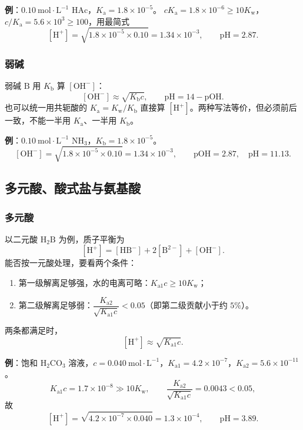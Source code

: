 \documentclass[UTF8]{ctexbook}
\begin{document}
\textbf{例}：$0.10\ \mathrm{mol\cdot L^{-1}}$ $\mathrm{HAc}$，$K_{\mathrm{a}}=1.8\times10^{-5}$。
$cK_{\mathrm{a}}=1.8\times10^{-6}\ge10K_{\mathrm{w}}$，$c/K_{\mathrm{a}}=5.6\times10^{3}\ge100$，用最简式
\[
[\mathrm{H^+}]=\sqrt{1.8\times10^{-5}\times0.10}=1.34\times10^{-3},
\qquad
\mathrm{pH}=2.87.
\]

\subsubsection{弱碱}

弱碱 $\mathrm{B}$ 用 $K_{\mathrm{b}}$ 算 $[\mathrm{OH^-}]$：
\[
[\mathrm{OH^-}]\approx\sqrt{K_{\mathrm{b}}c},
\qquad
\mathrm{pH}=14-\mathrm{pOH}.
\]
也可以统一用共轭酸的 $K_{\mathrm{a}}=K_{\mathrm{w}}/K_{\mathrm{b}}$ 直接算 $[\mathrm{H^+}]$。两种写法等价，但必须前后一致，不能一半用 $K_{\mathrm{a}}$、一半用 $K_{\mathrm{b}}$。

\textbf{例}：$0.10\ \mathrm{mol\cdot L^{-1}}$ $\mathrm{NH_3}$，$K_{\mathrm{b}}=1.8\times10^{-5}$。
\[
[\mathrm{OH^-}]=\sqrt{1.8\times10^{-5}\times0.10}=1.34\times10^{-3},
\qquad
\mathrm{pOH}=2.87,\quad \mathrm{pH}=11.13.
\]

\subsection{多元酸、酸式盐与氨基酸}

\subsubsection{多元酸}

以二元酸 $\mathrm{H_2B}$ 为例，质子平衡为
\[
[\mathrm{H^+}]=[\mathrm{HB^-}]+2[\mathrm{B^{2-}}]+[\mathrm{OH^-}].
\]
能否按一元酸处理，要看两个条件：
\begin{enumerate}
  \item 第一级解离足够强，水的电离可略：$K_{\mathrm{a1}}c\ge10K_{\mathrm{w}}$；
  \item 第二级解离足够弱：$\dfrac{K_{\mathrm{a2}}}{\sqrt{K_{\mathrm{a1}}c}}<0.05$（即第二级贡献小于约 $5\%$）。
\end{enumerate}
两条都满足时，
\[
[\mathrm{H^+}]\approx\sqrt{K_{\mathrm{a1}}c}.
\]

\textbf{例}：饱和 $\mathrm{H_2CO_3}$ 溶液，$c=0.040\ \mathrm{mol\cdot L^{-1}}$，$K_{\mathrm{a1}}=4.2\times10^{-7}$，$K_{\mathrm{a2}}=5.6\times10^{-11}$。
\[
K_{\mathrm{a1}}c=1.7\times10^{-8}\gg10K_{\mathrm{w}},\qquad
\frac{K_{\mathrm{a2}}}{\sqrt{K_{\mathrm{a1}}c}}=0.0043<0.05,
\]
故
\[
[\mathrm{H^+}]=\sqrt{4.2\times10^{-7}\times0.040}=1.3\times10^{-4},
\qquad
\mathrm{pH}=3.89.
\]
\end{document}
